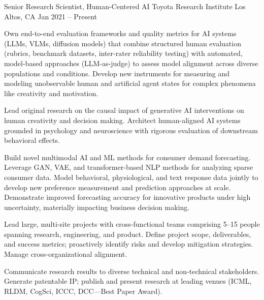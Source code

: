\documentclass[11pt, letterpaper]{awesome-cv-resume}
\begin{document}
\makecvheader[C]   %

\vspace{2mm}

\begin{cventries}

  \cventry
    {Senior Research Scientist, Human-Centered AI}
    {Toyota Research Institute}
    {Los Altos, CA}
    {Jan 2021 -- Present}
    {
      \begin{cvitems}
        \item Own end-to-end evaluation frameworks and quality metrics for AI systems (LLMs, VLMs, diffusion models) that combine structured human evaluation (rubrics, benchmark datasets, inter-rater reliability testing) with automated, model-based approaches (LLM-as-judge) to assess model alignment across diverse populations and conditions. Develop new instruments for measuring and modeling unobservable human and artificial agent states for complex phenomena like creativity and motivation.
        \item Lead original research on the causal impact of generative AI interventions on human creativity and decision making. Architect human-aligned AI systems grounded in psychology and neuroscience with rigorous evaluation of downstream behavioral effects.
        \item Build novel multimodal AI and ML methods for consumer demand forecasting. Leverage GAN, VAE, and transformer-based NLP methods for analyzing sparse consumer data. Model behavioral, physiological, and text response data jointly to develop new preference measurement and prediction approaches at scale. Demonstrate improved forecasting accuracy for innovative products under high uncertainty, materially impacting business decision making.
        \item Lead large, multi-site projects with cross-functional teams comprising 5--15 people spanning research, engineering, and product. Define project scope, deliverables, and success metrics; proactively identify risks and develop mitigation strategies. Manage cross-organizational alignment.
        \item Communicate research results to diverse technical and non-technical stakeholders. Generate patentable IP; publish and present research at leading venues (ICML, RLDM, CogSci, ICCC, DCC---Best Paper Award). 
      \end{cvitems}
    }


\end{cventries}
\end{document}
